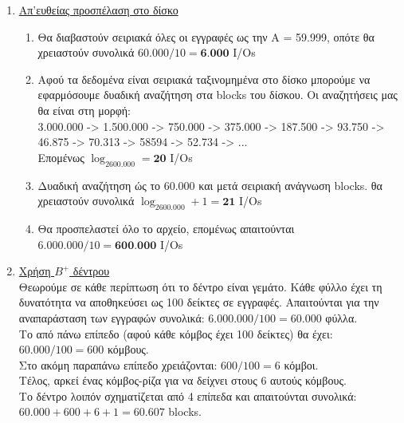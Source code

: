 \documentclass[a4paper,11pt]{article}
\begin{document}
\begin{enumerate}
    \item \underline{Απ'ευθείας προσπέλαση στο δίσκο}
    \begin{enumerate}
	\item Θα διαβαστούν σειριακά όλες οι εγγραφές ως την Α = 59.999, οπότε
	θα χρειαστούν συνολικά $60.000/10 = \textbf{6.000}$ I/Os
	\item Αφού τα δεδομένα είναι σειριακά ταξινομημένα στο δίσκο μπορούμε
	να εφαρμόσουμε δυαδική αναζήτηση στα blocks του δίσκου. Οι αναζητήσεις
	μας θα είναι στη μορφή:\\ 3.000.000 -> 1.500.000 -> 750.000 -> 375.000
	-> 187.500 -> 93.750 -> 46.875 -> 70.313 -> 58594 -> 52.734 -> ...\\
	Επομένως $\log_2600.000 = \textbf{20}$ I/Os
	\item Δυαδική αναζήτηση ώς το 60.000 και μετά σειριακή ανάγνωση blocks.
	θα χρειαστούν συνολικά $\log_2600.000 + 1= \textbf{21}$ I/Os
	\item Θα προσπελαστεί όλο το αρχείο, επομένως απαιτούνται $6.000.000/10
	= \textbf{600.000}$ I/Os
    \end{enumerate}

    \item \underline{Χρήση $B^+$ δέντρου}\\
    Θεωρούμε σε κάθε περίπτωση ότι το δέντρο είναι γεμάτο. Κάθε φύλλο έχει τη
    δυνατότητα να αποθηκεύσει ως 100 δείκτες σε εγγραφές. Απαιτούνται για την
    αναπαράσταση των εγγραφών συνολικά: $6.000.000/100 = 60.000$ φύλλα.\\
    Το από πάνω επίπεδο (αφού κάθε κόμβος έχει 100 δείκτες) θα έχει:\\
    $60.000/100 = 600$ κόμβους.\\
    Στο ακόμη παραπάνω επίπεδο χρειάζονται: $600/100 = 6$ κόμβοι.\\
    Τέλος, αρκεί ένας κόμβος-ρίζα για να δείχνει στους 6 αυτούς κόμβους.\\
    Το δέντρο λοιπόν σχηματίζεται από 4 επίπεδα και απαιτούνται συνολικά:\\
    $60.000 + 600 + 6 + 1 = 60.607$ blocks.


\end{enumerate}
\end{document}
